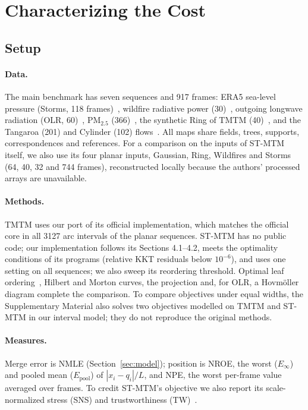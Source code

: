 \documentclass[review]{vgtc}
\begin{document}
\section{Characterizing the Cost}\label{sec:experiments}
\subsection{Setup}
\paragraph{Data.} The main benchmark has seven sequences and 917 frames: ERA5 sea-level pressure (Storms, 118 frames)~\cite{Hersbach:2020:ERA5}, wildfire radiative power (30)~\cite{Franke:2021:1DP}, outgoing longwave radiation (OLR, 60)~\cite{NOAA:OLR}, PM$_{2.5}$ (366)~\cite{Dong:2026:PM25}, the synthetic Ring of TMTM (40)~\cite{Koepp:2023:TMTM}, and the Tangaroa (201) and Cylinder (102) flows~\cite{Popinet:2004:Tangaroa,Camarri:2005:Cylinder,Weinkauf:SquareCylinder}. All maps share fields, trees, supports, correspondences and references. For a comparison on the inputs of ST-MTM itself, we also use its four planar inputs, Gaussian, Ring, Wildfires and Storms (64, 40, 32 and 744 frames), reconstructed locally because the authors' processed arrays are unavailable.

\paragraph{Methods.} TMTM uses our port of its official implementation, which matches the official core in all 3127 arc intervals of the planar sequences. ST-MTM has no public code; our implementation follows its Sections 4.1--4.2, meets the optimality conditions of its programs (relative KKT residuals below $10^{-6}$), and uses one setting on all sequences; we also sweep its reordering threshold. Optimal leaf ordering~\cite{BarJoseph:2001:OLO}, Hilbert and Morton curves, the projection and, for OLR, a Hovm\"oller diagram complete the comparison. To compare objectives under equal widths, the Supplementary Material also solves two objectives modelled on TMTM and ST-MTM in our interval model; they do not reproduce the original methods.

\paragraph{Measures.} Merge error is NMLE (Section~\ref{sec:model}); position is NROE, the worst ($E_\infty$) and pooled mean ($E_{\mathrm{pool}}$) of $|x_i-q_i|/L$, and NPE, the worst per-frame value averaged over frames. To credit ST-MTM's objective we also report its scale-normalized stress (SNS) and trustworthiness (TW)~\cite{Smelser:2025:Scale,Venna:2001:NP}.
\end{document}
